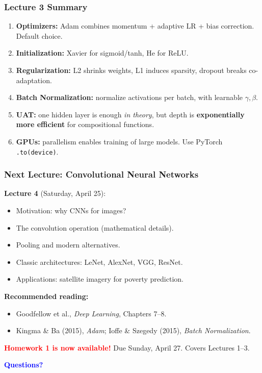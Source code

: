\documentclass[notes,11pt, aspectratio=169]{beamer}
\begin{document}
\begin{frame}
\frametitle{Lecture 3 Summary}

\begin{enumerate}
    \item \textbf{Optimizers:} Adam combines momentum + adaptive LR + bias correction. Default choice.

    \item \textbf{Initialization:} Xavier for sigmoid/tanh, He for ReLU.

    \item \textbf{Regularization:} L2 shrinks weights, L1 induces sparsity, dropout breaks co-adaptation.

    \item \textbf{Batch Normalization:} normalize activations per batch, with learnable $\gamma, \beta$.

    \item \textbf{UAT:} one hidden layer is enough \textit{in theory}, but depth is \textbf{exponentially more efficient} for compositional functions.

    \item \textbf{GPUs:} parallelism enables training of large models. Use PyTorch \texttt{.to(device)}.
\end{enumerate}
\end{frame}

\begin{frame}
\frametitle{Next Lecture: Convolutional Neural Networks}

\textbf{Lecture 4} (Saturday, April 25):
\begin{itemize}
    \item Motivation: why CNNs for images?
    \item The convolution operation (mathematical details).
    \item Pooling and modern alternatives.
    \item Classic architectures: LeNet, AlexNet, VGG, ResNet.
    \item Applications: satellite imagery for poverty prediction.
\end{itemize}

\vspace{6pt}
\textbf{Recommended reading:}
\begin{itemize}
    \item Goodfellow et al., \textit{Deep Learning}, Chapters 7--8.
    \item Kingma \& Ba (2015), \textit{Adam}; Ioffe \& Szegedy (2015), \textit{Batch Normalization}.
\end{itemize}

\vspace{6pt}
\textcolor{red}{\textbf{Homework 1 is now available!}} Due Sunday, April 27. Covers Lectures 1--3.

\vspace{4pt}
\begin{center}
\Large \textcolor{blue}{\textbf{Questions?}}
\end{center}
\end{frame}
\end{document}
